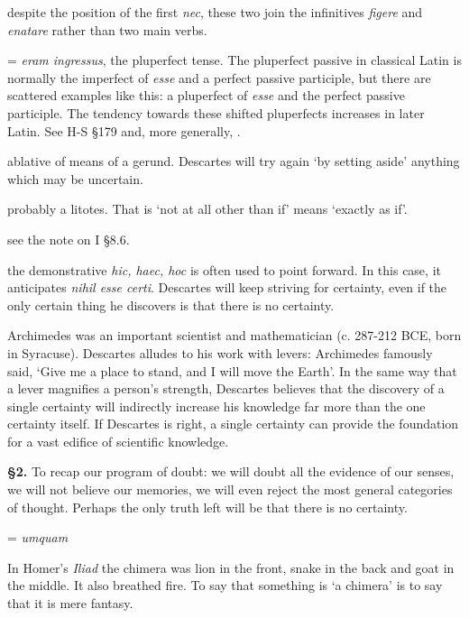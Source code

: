  despite the position of the first \textit{nec}, these two join the infinitives \textit{figere} and \textit{enatare} rather than two main verbs.

 = \textit{eram ingressus}, the pluperfect tense. The pluperfect passive in classical Latin is normally the imperfect of \textit{esse} and a perfect passive participle, but there are scattered examples like this: a pluperfect of \textit{esse} and the perfect passive participle. The tendency towards these shifted pluperfects increases in later Latin. See H-S §179 and, more generally, \citet[§298]{väänänen1981}.

 ablative of means of a gerund. Descartes will try again `by setting aside' anything which may be uncertain.

 probably a litotes. That is `not at all other than if' means `exactly as if'.

 see the note on I §8.6.

 the demonstrative \textit{hic, haec, hoc} is often used to point forward. In this case, it anticipates \textit{nihil esse certi}. Descartes will keep striving for certainty, even if the only certain thing he discovers is that there is no certainty.

 Archimedes was an important scientist and mathematician (c. 287-212 BCE, born in Syracuse). Descartes alludes to his work with levers: Archimedes famously said, `Give me a place to stand, and I will move the Earth'. In the same way that a lever magnifies a person's strength, Descartes believes that the discovery of a single certainty will indirectly increase his knowledge far more than the one certainty itself. If Descartes is right, a single certainty can provide the foundation for a vast edifice of scientific knowledge.

\textbf{§2.} To recap our program of doubt: we will doubt all the evidence of our senses, we will not believe our memories, we will even reject the most general categories of thought. Perhaps the only truth left will be that there is no certainty.

 = \textit{umquam}

 In Homer's \textit{Iliad} the chimera was lion in the front, snake in the back and goat in the middle. It also breathed fire. To say that something is `a chimera' is to say that it is mere fantasy.

